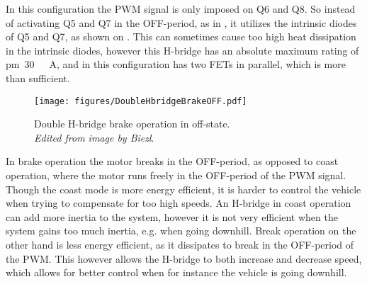 In this configuration the PWM signal is only imposed on Q6 and Q8. So instead of activating Q5 and Q7 in the OFF-period, as in , it utilizes the intrinsic diodes of Q5 and Q7, as shown on . This can sometimes cause too high heat dissipation in the intrinsic diodes, however this H-bridge has an absolute maximum rating of \si{\pm 30 \ A}, and in this configuration has two FETs in parallel, which is more than sufficient\cite{STMicroelectronics}.

\begin{figure}[H]
	\centering
	\texttt{[image: figures/DoubleHbridgeBrakeOFF.pdf]}
	\caption{Double H-bridge brake operation in off-state.\\ \emph{Edited from image by Biezl}.\cite{Biezl}}
	\label{DoubleHbridgeBrakeOFF}
\end{figure}\vspace{-5mm}

In brake operation the motor breaks in the OFF-period, as opposed to coast operation, where the motor runs freely in the OFF-period of the PWM signal. Though the coast mode is more energy efficient, it is harder to control the vehicle when trying to compensate for too high speeds. An H-bridge in coast operation can add more inertia to the system, however it is not very efficient when the system gains too much inertia, e.g. when going downhill. Break operation on the other hand is less energy efficient, as it dissipates to break in the OFF-period of the PWM. This however allows the H-bridge to both increase and decrease speed, which allows for better control when for instance the vehicle is going downhill.